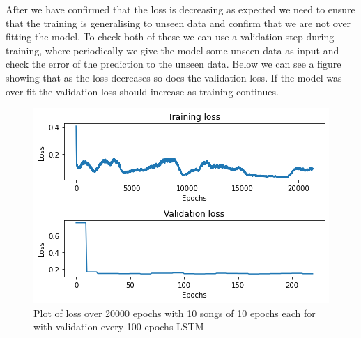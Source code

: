 \documentclass{article}
\begin{document}
After we have confirmed that the loss is decreasing as expected we need to ensure that the training is generalising to unseen data and confirm that we are not over fitting the model. To check both of these we can use a validation step during training, where periodically we give the model some unseen data as input and check the error of the prediction to the unseen data. Below we can see a figure showing that as the loss decreases so does the validation loss. If the model was over fit the validation loss should increase as training continues.
\begin{figure}[H]
\centering
\caption{Plot of loss over 20000 epochs with 10 songs of 10 epochs each for with validation every 100 epochs LSTM}
\includegraphics[scale=0.7]{validation.png}
\end{figure}
\end{document}
